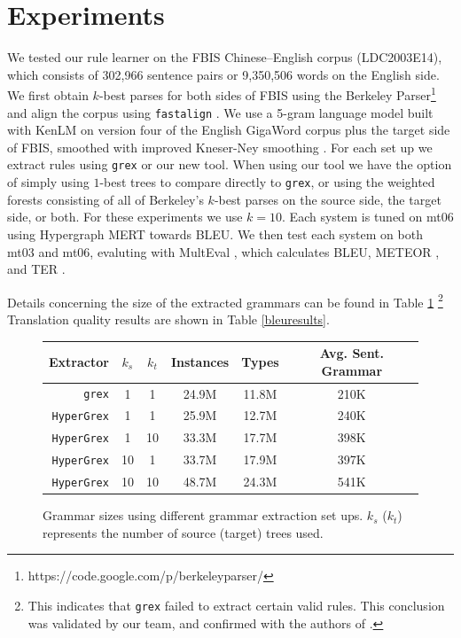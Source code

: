 \documentclass[nofonts]{pbml} %
\begin{document}
\section{Experiments}
\label{sec:experiments}
We tested our rule learner on the FBIS Chinese--English corpus (LDC2003E14), which consists of 302,966 sentence pairs or 9,350,506 words on the English side.
We first obtain $k$-best parses for both sides of FBIS using the Berkeley Parser\footnote{https://code.google.com/p/berkeleyparser/} and align the corpus using \texttt{fastalign} \cite{dyer-chahuneau-smith:2013:NAACL-HLT}.
We use a 5-gram language model built with KenLM \cite{heafield2011kenlm} on version four of the English GigaWord corpus plus the target side of FBIS, smoothed with improved Kneser-Ney smoothing \cite{kneser1995improved}.
For each set up we extract rules using \texttt{grex} \cite{hanneman2011general} or our new tool.
When using our tool we have the option of simply using $1$-best trees to compare directly to \texttt{grex}, or using the weighted forests consisting of all of Berkeley's $k$-best parses on
the source side, the target side, or both. For these experiments we use $k=10$.
Each system is tuned on mt06 using Hypergraph MERT \cite{kumar2009efficient} towards BLEU.
We then test each system on both mt03 and mt06, evaluting with MultEval \cite{clark2011better}, which calculates BLEU, METEOR \cite{denkowski2011meteor}, and TER \cite{snover2006study}.

Details concerning the size of the extracted grammars can be found in Table \ref{grammarsizes}
\footnote{This indicates that \texttt{grex} failed to extract certain valid rules. This conclusion was validated by our team, and confirmed with the authors of \cite{hanneman2011general}.}
Translation quality results are shown in Table \ref{bleuresults}.

\begin{figure}[ht!]
\centering
\begin{tabular}{r c c c c c}
Extractor & $k_s$ & $k_t$ & Instances & Types & Avg. Sent. Grammar \\
\hline
\texttt{grex}      &  1 &  1 & 24.9M & 11.8M & 210K \\
\texttt{HyperGrex} &  1 &  1 & 25.9M & 12.7M & 240K \\
\texttt{HyperGrex} &  1 & 10 & 33.3M & 17.7M & 398K \\
\texttt{HyperGrex} & 10 &  1 & 33.7M & 17.9M & 397K \\
\texttt{HyperGrex} & 10 & 10 & 48.7M & 24.3M & 541K \\
\end{tabular}
\caption{Grammar sizes using different grammar extraction set ups.
$k_s$ ($k_t$) represents the number of source (target) trees used.}
\label{grammarsizes}
\end{figure}
\end{document}
